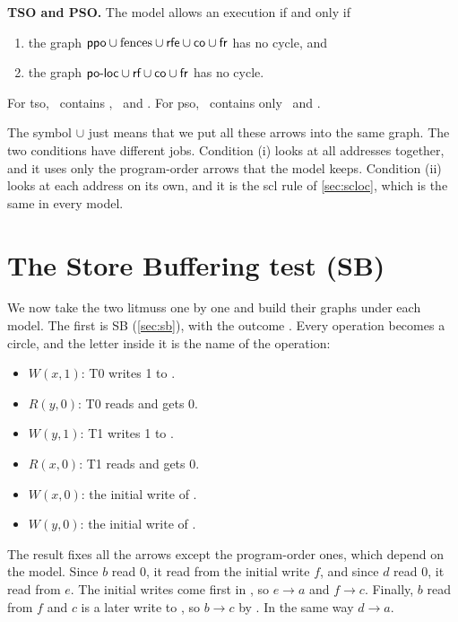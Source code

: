 \begin{notebox}
\textbf{TSO and PSO.} The model allows an execution if and only if
\begin{enumerate}[label=(\roman*)]
\item the graph $\textsf{ppo} \cup \text{fences} \cup \textsf{rfe} \cup \textsf{co} \cup \textsf{fr}$ has no cycle, and
\item the graph $\textsf{po-loc} \cup \textsf{rf} \cup \textsf{co} \cup \textsf{fr}$ has no cycle.
\end{enumerate}
For \gls{tso}, \ppo\ contains \RR, \RW\ and \WW. For \gls{pso}, \ppo\ contains only \RR\ and \RW.
\end{notebox}

The symbol $\cup$ just means that we put all these arrows into the same graph. The two conditions have different jobs. Condition (i) looks at all addresses together, and it uses only the program-order arrows that the model keeps. Condition (ii) looks at each address on its own, and it is the \gls{scl} rule of \cref{sec:scloc}, which is the same in every model.

\section{The Store Buffering test (SB)}
\label{sec:sbgraph}

We now take the two \gls{litmus}s one by one and build their graphs under each model. The first is SB (\cref{sec:sb}), with the outcome . Every operation becomes a circle, and the letter inside it is the name of the operation:
\begin{itemize}
\item[\textbf{a}] $W(x,1)$: T0 writes 1 to .
\item[\textbf{b}] $R(y,0)$: T0 reads  and gets 0.
\item[\textbf{c}] $W(y,1)$: T1 writes 1 to .
\item[\textbf{d}] $R(x,0)$: T1 reads  and gets 0.
\item[\textbf{e}] $W(x,0)$: the initial write of .
\item[\textbf{f}] $W(y,0)$: the initial write of .
\end{itemize}
The result fixes all the arrows except the program-order ones, which depend on the model. Since $b$ read 0, it read from the initial write $f$, and since $d$ read 0, it read from $e$. The initial writes come first in \co, so $e \to a$ and $f \to c$. Finally, $b$ read from $f$ and $c$ is a later write to , so $b \to c$ by \fr. In the same way $d \to a$.

